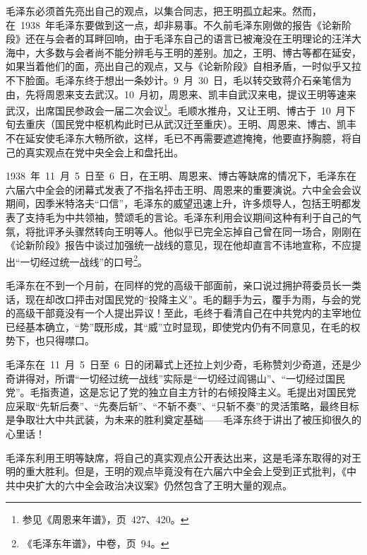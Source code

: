 毛泽东必须首先亮出自己的观点，以集合同志，把王明孤立起来。然而，在~1938~年毛泽东要做到这一点，却非易事。不久前毛泽东刚做的报告《论新阶段》还在与会者的耳畔回响，由于毛泽东自己的语言已被淹没在王明理论的汪洋大海中，大多数与会者尚不能分辨毛与王明的差别。加之，王明、博古等都在延安，如果当着他们的面，亮出自己的观点，又与《论新阶段》自相矛盾，一时似乎又拉不下脸面。毛泽东终于想出一条妙计。9~月~30~日，毛以转交致蒋介石亲笔信为由，先将周恩来支去武汉。10~月初，周恩来、凯丰自武汉来电，提议王明等速来武汉，出席国民参政会一届二次会议\footnote{参见《周恩来年谱》，页~427、420。}。毛顺水推舟，又让王明、博古于~10~月下旬去重庆（国民党中枢机构此时已从武汉迁至重庆）。王明、周恩来、博古、凯丰不在延安使毛泽东大畅所欲，这样，毛已不再需要遮遮掩掩，他要直抒胸臆，将自己的真实观点在党中央全会上和盘托出。

1938~年~11~月~5~日至~6~日，在王明、周恩来、博古等缺席的情况下，毛泽东在六届六中全会的闭幕式发表了不指名抨击王明、周恩来的重要演说。六中全会会议期间，因季米特洛夫“口信”，毛泽东的威望迅速上升，许多烦导人，包括王明都发表了支持毛为中共领袖，赞颂毛的言论。毛泽东利用会议期间这种有利于自己的气氛，将批评矛头骤然转向王明等人。他似乎已完全忘掉自己曾在同一场合，刚刚在《论新阶段》报告中谈过加强统一战线的意见，现在他却直言不讳地宣称，不应提出“一切经过统一战线”的口号\footnote{《毛泽东年谱》，中卷，页~94。}。

毛泽东在不到一个月前，在同样的党的高级干部面前，亲口说过拥护蒋委员长一类话，现在却改口抨击对国民党的“投降主义”。毛的翻手为云，覆手为雨，与会的党的高级干部竟没有一个人提出异议！至此，毛终于看清自己在中共党内的主宰地位已经基本确立，“势”既形成，其“威”立时显现，即使党内仍有不同意见，在毛的权势下，也只得噤口。

毛泽东在~11~月~5~日至~6~日的闭幕式上还拉上刘少奇，毛称赞刘少奇道，还是少奇讲得对，所谓“一切经过统一战线”实际是“一切经过阎锡山”、“一切经过国民党”。毛指责道，这是忘记了党的独立自主方针的右倾投降主义。毛提出对国民党应采取“先斩后奏”、“先奏后斩”、“不斩不奏”、“只斩不奏”的灵活策略，最终目标是争取壮大中共武装，为未来的胜利奠定基础——毛泽东终于讲出了被压抑很久的心里话！

毛泽东利用王明等缺席，将自己的真实观点公开表达出来，这是毛泽东取得的对王明的重大胜利。但是，王明的观点毕竟没有在六届六中全会上受到正式批判，《中共中央扩大的六中全会政治决议案》仍然包含了王明大量的观点。

